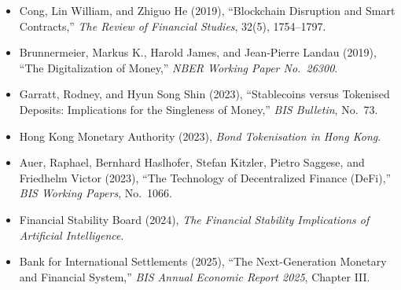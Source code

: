 \begin{itemize}

\item Cong, Lin William, and Zhiguo He (2019),
``Blockchain Disruption and Smart Contracts,''
\emph{The Review of Financial Studies}, 32(5), 1754--1797.

\item Brunnermeier, Markus K., Harold James, and Jean-Pierre Landau (2019),
``The Digitalization of Money,''
\emph{NBER Working Paper No.~26300}.

\item Garratt, Rodney, and Hyun Song Shin (2023),
``Stablecoins versus Tokenised Deposits: Implications for the Singleness of Money,''
\emph{BIS Bulletin}, No.~73.

\item Hong Kong Monetary Authority (2023),
\emph{Bond Tokenisation in Hong Kong}.

\item Auer, Raphael, Bernhard Haslhofer, Stefan Kitzler, Pietro Saggese, and Friedhelm Victor (2023),
``The Technology of Decentralized Finance (DeFi),''
\emph{BIS Working Papers}, No.~1066.

\item Financial Stability Board (2024),
\emph{The Financial Stability Implications of Artificial Intelligence}.

\item Bank for International Settlements (2025),
``The Next-Generation Monetary and Financial System,''
\emph{BIS Annual Economic Report 2025}, Chapter III.


\end{itemize}


